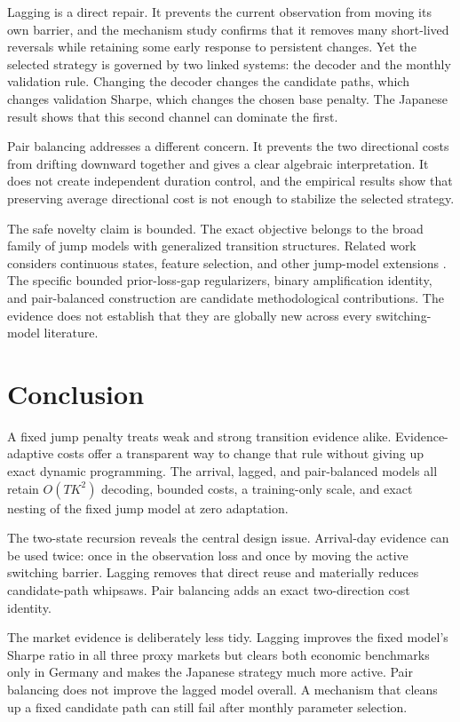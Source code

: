 \documentclass[11pt]{article}
\begin{document}
Lagging is a direct repair. It prevents the current observation from moving its own barrier, and the mechanism study confirms that it removes many short-lived reversals while retaining some early response to persistent changes. Yet the selected strategy is governed by two linked systems: the decoder and the monthly validation rule. Changing the decoder changes the candidate paths, which changes validation Sharpe, which changes the chosen base penalty. The Japanese result shows that this second channel can dominate the first.

Pair balancing addresses a different concern. It prevents the two directional costs from drifting downward together and gives a clear algebraic interpretation. It does not create independent duration control, and the empirical results show that preserving average directional cost is not enough to stabilize the selected strategy.

The safe novelty claim is bounded. The exact objective belongs to the broad family of jump models with generalized transition structures. Related work considers continuous states, feature selection, and other jump-model extensions \citep{aydinhan2024,nystrup2021}. The specific bounded prior-loss-gap regularizers, binary amplification identity, and pair-balanced construction are candidate methodological contributions. The evidence does not establish that they are globally new across every switching-model literature.

\section{Conclusion}

A fixed jump penalty treats weak and strong transition evidence alike. Evidence-adaptive costs offer a transparent way to change that rule without giving up exact dynamic programming. The arrival, lagged, and pair-balanced models all retain $O(TK^2)$ decoding, bounded costs, a training-only scale, and exact nesting of the fixed jump model at zero adaptation.

The two-state recursion reveals the central design issue. Arrival-day evidence can be used twice: once in the observation loss and once by moving the active switching barrier. Lagging removes that direct reuse and materially reduces candidate-path whipsaws. Pair balancing adds an exact two-direction cost identity.

The market evidence is deliberately less tidy. Lagging improves the fixed model's Sharpe ratio in all three proxy markets but clears both economic benchmarks only in Germany and makes the Japanese strategy much more active. Pair balancing does not improve the lagged model overall. A mechanism that cleans up a fixed candidate path can still fail after monthly parameter selection.
\end{document}
